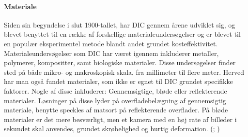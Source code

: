 \paragraph{Materiale}
Siden sin begyndelse i slut 1900-tallet, har DIC gennem årene udviklet sig, og blevet benyttet til en række af forskellige materialeundersøgelser og er blevet til en populær eksperimentel metode blandt andet grundet kosteffektivitet. Materialeundersøgelser som DIC har været igennem inkluderer metaller, polymerer, kompositter, samt biologiske materialer. Disse undersøgelser finder sted på både mikro- og makroskopisk skala, fra millimeter til flere meter. Herved har man også fundet materialer, som ikke er egnet til DIC grundet specifikke faktorer. Nogle af disse inkluderer: Gennemsigtige, bløde eller reflekterende materialer. Løsninger på disse lyder på overfladebelægning af gennemsigtig materiale, benytte speckles af matsort på reflekterende overflader. På bløde materialer er det mere besværligt, men et kamera med en høj rate af billeder i sekundet skal anvendes, grundet skrøbelighed og hurtig deformation. (\cite{Dong2017ACorrelation}; \cite{Bigger2018ACorrelation})


